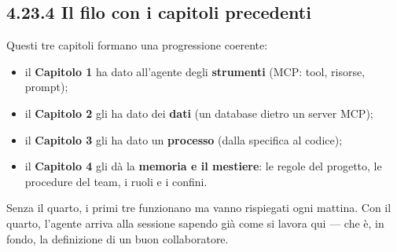 \documentclass[
  italian,
  10pt,
]{book}
\providecommand{\tightlist}{%
  \setlength{\itemsep}{0pt}\setlength{\parskip}{0pt}}
\begin{document}
\subsection{4.23.4 Il filo con i capitoli
precedenti}\label{il-filo-con-i-capitoli-precedenti}

Questi tre capitoli formano una progressione coerente:

\begin{itemize}
\tightlist
\item
  il \textbf{Capitolo 1} ha dato all'agente degli \textbf{strumenti}
  (MCP: tool, risorse, prompt);
\item
  il \textbf{Capitolo 2} gli ha dato dei \textbf{dati} (un database
  dietro un server MCP);
\item
  il \textbf{Capitolo 3} gli ha dato un \textbf{processo} (dalla
  specifica al codice);
\item
  il \textbf{Capitolo 4} gli dà la \textbf{memoria e il mestiere}: le
  regole del progetto, le procedure del team, i ruoli e i confini.
\end{itemize}

Senza il quarto, i primi tre funzionano ma vanno rispiegati ogni
mattina. Con il quarto, l'agente arriva alla sessione sapendo già come
si lavora qui --- che è, in fondo, la definizione di un buon
collaboratore.

\backmatter
\end{document}
